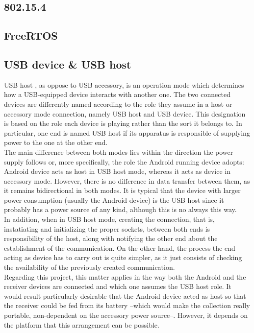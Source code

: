 		\subsection{802.15.4}
		\label{ssec:802.15.4}
		\subsection{FreeRTOS}
		\label{ssec:FreeRTOS}
		\subsection{USB device \& USB host}
			USB host \cite{usbhost}, as oppose to USB accessory, is an operation mode which determines how a
			USB-equipped device interacts with another one. The two connected devices are differently named
			according to the role they assume in a host or accessory mode connection, namely USB host and USB
			device. This designation is based on the role each device is playing rather than the sort it belongs
			to. In particular, one end is named USB host if its apparatus is responsible of supplying power to
			the one at the other end.\\

			The main difference between both modes lies within the direction the power supply follows or, more
			specifically, the role the Android running device adopts: Android device acts as host in USB host
			mode, whereas it acts as device in accessory mode. However, there is no difference in data transfer
			between them, as it remains bidirectional in both modes. It is typical that the device with larger
			power consumption (usually the Android device) is the USB host since it probably has a power source
			of any kind, although this is no always this way.\\

			In addition, when in USB host mode, creating the connection, that is, instatiating and initializing
			the proper sockets, between both ends is responsibility of the host, along with notifying the other
			end about the establishment of the communication. On the other hand, the process the end acting as
			device has to carry out is quite simpler, as it just consists of checking the availability of the
			previously created communication.\\

			Regarding this project, this matter applies in the way both the Android and the receiver devices are
			connected and which one assumes the USB host role. It would result particularly desirable that the
			Android device acted as host so that the receiver could be fed from its battery --which would make the
			collection really portable, non-dependent on the accessory power source--. However, it depends on
			the platform that this arrangement can be possible.\\

